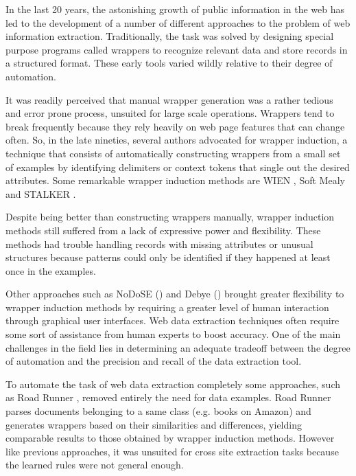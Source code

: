 \documentclass[sigconf]{acmart}
\begin{document}
In the last 20 years, the astonishing growth of public information in the web has 
led to the development of a number of different approaches to the problem of web 
information extraction. Traditionally, the task was solved by designing special purpose
programs called wrappers to recognize relevant data and store records in a structured
format. These early tools varied wildly relative to their degree of automation. 

It was readily perceived that manual wrapper generation was a rather tedious and
error prone process, unsuited for large scale operations. Wrappers tend to
break frequently because they rely heavily on web page features that can change 
often. So, in the late nineties, several authors advocated for wrapper induction, a technique 
that consists of automatically constructing wrappers from a small set of examples by 
identifying delimiters or context tokens that single out the desired attributes. 
Some remarkable wrapper induction methods are WIEN \cite{Kushmerick2000}, Soft 
Mealy \cite{Hsu1998} and STALKER \cite{Muslea1999}.

Despite being better than constructing wrappers manually, wrapper induction methods 
still suffered from a lack of expressive power and flexibility. These methods had 
trouble handling records with missing attributes or unusual structures because
patterns could only be identified if they happened at least once in the examples.

Other approaches such as NoDoSE (\cite{Adelberg1998}) and Debye (\cite{Laender2002a}) 
brought greater flexibility to wrapper induction methods by requiring a greater level 
of human interaction through graphical user interfaces. Web data extraction techniques often 
require some sort of assistance from human experts to boost accuracy. One of the main challenges 
in the field lies in determining an adequate tradeoff between the degree of automation and 
the precision and recall of the data extraction tool.

To automate the task of web data extraction completely some approaches,
such as Road Runner \cite{Crescenzi2001}, removed entirely the need for data examples.
Road Runner parses documents belonging to a same class (e.g. books on Amazon) and 
generates wrappers based on their similarities and differences, yielding comparable results 
to those obtained by wrapper induction methods. However like previous approaches, it was 
unsuited for cross site extraction tasks because the learned rules were not general enough.
\end{document}
